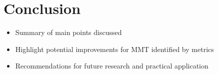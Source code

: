 \documentclass[sigplan, nonacm]{acmart}
\begin{document}
\section{Conclusion}
\begin{itemize}
    \item Summary of main points discussed
    \item Highlight potential improvements for MMT identified by metrics
    \item Recommendations for future research and practical application
\end{itemize}



\end{document}
